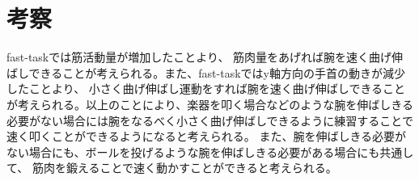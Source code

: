 \documentclass{jsarticle}
\begin{document}
\section{考察}
fast-taskでは筋活動量が増加したことより、
筋肉量をあげれば腕を速く曲げ伸ばしできることが考えられる。また、fast-taskではy軸方向の手首の動きが減少したことより、
小さく曲げ伸ばし運動をすれば腕を速く曲げ伸ばしできることが考えられる。以上のことにより、楽器を叩く場合などのような腕を伸ばしきる必要がない場合には腕をなるべく小さく曲げ伸ばしできるように練習することで速く叩くことができるようになると考えられる。
また、腕を伸ばしきる必要がない場合にも、ボールを投げるような腕を伸ばしきる必要がある場合にも共通して、
筋肉を鍛えることで速く動かすことができると考えられる。

%
%
\end{document}
